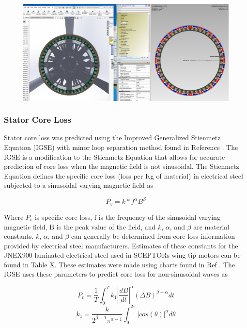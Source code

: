 \documentclass[]{aiaa-tc}%
\begin{document}
\begin{figure}[!htb]%
	\centering
	\includegraphics[width=1.0\textwidth]{figures/motorSolve.png}
	\caption{}
	\label{fig:motorSolve}
\end{figure}

\subsubsection{Stator Core Loss}
Stator core loss was predicted using the Improved Generalized Stienmetz Equation (IGSE) with minor loop separation method found in Reference \cite{CoreLoss}. The IGSE is a modification to the Stienmetz Equation that allows for accurate prediction of core loss when the magnetic field is not sinusoidal. The Stienmetz Equation defines the specific core loss (loss per Kg of material) in electrical steel subjected to a sinusoidal varying magnetic field as

\begin{equation}
P_{v} = k*f^{\alpha}B^{\beta}
\label{eq:CoreLoss}
\end{equation}

Where $P_v$ is specific core loss, f is the frequency of the sinusoidal varying magnetic field, B is the peak value of the field, 
and $k$, $\alpha$, and $\beta$ are material constants. $k$, $\alpha$, and $\beta$  
can generally be determined from core loss information provided by electrical steel manufacturers. 
Estimates of these constants for the JNEX900 laminated electrical steel used in SCEPTORs wing tip motors can be found in Table X. 
These estimates were made using charts found in Ref \cite{JFE}. The IGSE uses these parameters to predict core loss for non-sinusoidal waves as


\begin{equation}
P_{v} = \frac{1}{T}\int_{0}^{T}k_{1}|\frac{dB}{dt}|^{\alpha}(\Delta B)^{\beta-\alpha}dt
\label{eq:CoreLoss2}
\end{equation}
\begin{equation}
k_{1} = \frac{k}{2^{\beta-1}\pi^{\alpha-1}}\int_{0}^{2\pi}|cos(\theta)|^{\alpha}d\theta
\label{eq:CoreLoss2b}
\end{equation}
\end{document}

